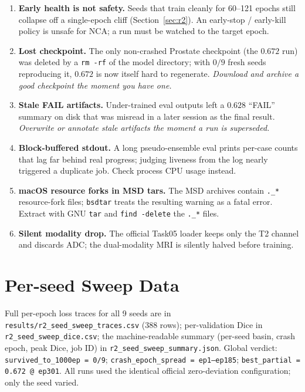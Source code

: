 \documentclass[10pt,twocolumn]{article}
\newcommand{\dice}{\mathrm{Dice}}
\begin{document}
\begin{enumerate}[leftmargin=1.4em, itemsep=3pt]
  to completion. A GUI monitor that only watched for NaN/OOM missed it and
  burned $2.5$\,h of GPU. \emph{Detector:} after epoch 10, $\text{loss}>3$
  with validation $\dice<0.05$ = dead; cancel immediately.
\item \textbf{Early health is not safety.} Seeds that train cleanly for
  60--121 epochs still collapse off a single-epoch cliff
  (Section~\ref{sec:r2}). An early-stop / early-kill policy is unsafe for
  NCA; a run must be watched to the target epoch.
\item \textbf{Lost checkpoint.} The only non-crashed Prostate checkpoint
  (the $0.672$ run) was deleted by a \texttt{rm -rf} of the model
  directory; with $0/9$ fresh seeds reproducing it, $0.672$ is now itself
  hard to regenerate. \emph{Download and archive a good checkpoint the
  moment you have one.}
\item \textbf{Stale FAIL artifacts.} Under-trained eval outputs left a
  $0.628$ ``FAIL'' summary on disk that was misread in a later session as
  the final result. \emph{Overwrite or annotate stale artifacts the moment
  a run is superseded.}
\item \textbf{Block-buffered stdout.} A long pseudo-ensemble eval prints
  per-case counts that lag far behind real progress; judging liveness from
  the log nearly triggered a duplicate job. Check process CPU usage
  instead.
\item \textbf{macOS resource forks in MSD tars.} The MSD archives contain
  \texttt{.\_*} resource-fork files; \texttt{bsdtar} treats the resulting
  warning as a fatal error. Extract with GNU \texttt{tar} and
  \texttt{find -delete} the \texttt{.\_*} files.
\item \textbf{Silent modality drop.} The official Task05 loader keeps only
  the T2 channel and discards ADC; the dual-modality MRI is silently halved
  before training.
\end{enumerate}

\section{Per-seed Sweep Data}
\label{app:seed}
\small
Full per-epoch loss traces for all 9 seeds are in
\texttt{results/r2\_seed\_sweep\_traces.csv} (388 rows); per-validation Dice
in \texttt{r2\_seed\_sweep\_dice.csv}; the machine-readable summary
(per-seed basin, crash epoch, peak Dice, job ID) in
\texttt{r2\_seed\_sweep\_summary.json}. Global verdict:
\texttt{survived\_to\_1000ep = 0/9}; \texttt{crash\_epoch\_spread =
ep1--ep185}; \texttt{best\_partial = 0.672 @ ep301}. All runs used the
identical official zero-deviation configuration; only the seed varied.
\end{document}
